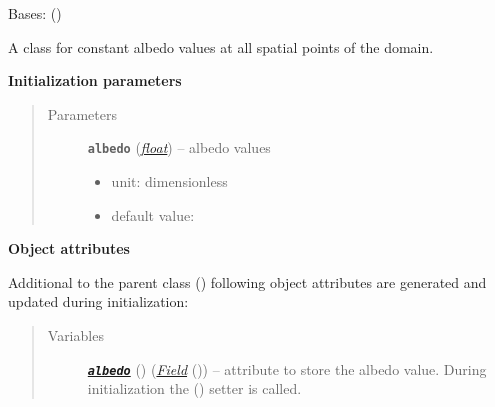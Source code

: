 \documentclass[a4paper,10pt,english]{sphinxmanual}
\begin{document}
\begin{fulllineitems}
\label{api/climlab.surface:climlab.surface.albedo.ConstantAlbedo}
Bases: {\hyperref[api/climlab.process:climlab.process.diagnostic.DiagnosticProcess]{\emph{}}} ()

A class for constant albedo values at all spatial points of the domain.

\textbf{Initialization parameters}
\begin{quote}\begin{description}
\item[{Parameters}] \leavevmode
\textbf{\texttt{albedo}} (\href{http://docs.python.org/2.7/library/functions.html\#float}{\emph{float}}) -- 
albedo values
\begin{itemize}
\item {} 
unit: dimensionless

\item {} 
default value: 

\end{itemize}


\end{description}\end{quote}

\textbf{Object attributes}

Additional to the parent class 
{\hyperref[api/climlab.process:climlab.process.diagnostic.DiagnosticProcess]{\emph{}}} ()
following object attributes are generated and updated during initialization:
\begin{quote}\begin{description}
\item[{Variables}] \leavevmode
{\hyperref[api/climlab.surface:module\string-climlab.surface.albedo]{\emph{\textbf{\texttt{albedo}}}}} () ({\hyperref[api/climlab.domain:climlab.domain.field.Field]{\emph{\emph{Field}}}} ()) -- attribute to store the albedo value. 
During initialization the 
{\hyperref[api/climlab.surface:climlab.surface.albedo.ConstantAlbedo.albedo]{\emph{}}} () setter is called.


\end{description}
\end{quote}
\end{fulllineitems}
\end{document}

